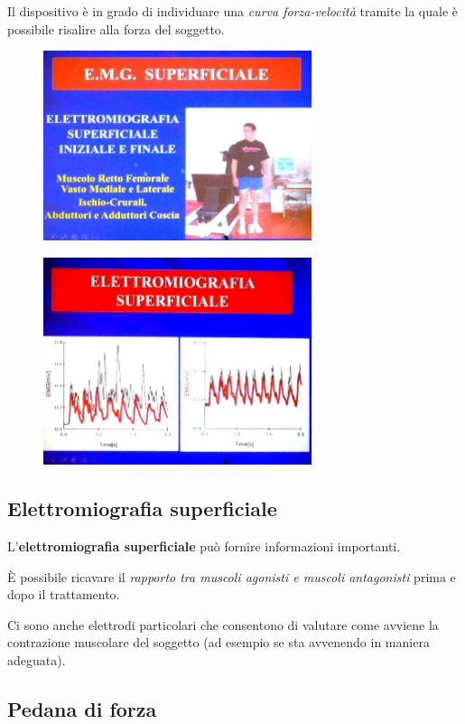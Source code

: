 Il dispositivo è in grado di individuare una \emph{curva forza-velocità}
tramite la quale è possibile risalire alla forza del soggetto.
\begin{figure}[!ht]
\centering
	\includegraphics[width=0.7\textwidth]{030/image10.jpeg}
\end{figure}

\begin{figure}[!ht]
\centering
	\includegraphics[width=0.7\textwidth]{030/image11.jpeg}
\end{figure}

\subsection{Elettromiografia superficiale }

L'\textbf{elettromiografia superficiale} può fornire informazioni
importanti.

È possibile ricavare il \emph{rapporto tra muscoli agonisti e muscoli
antagonisti} prima e dopo il trattamento.

Ci sono anche elettrodi particolari che consentono di valutare come
avviene la contrazione muscolare del soggetto (ad esempio se sta
avvenendo in maniera adeguata).
\subsection{Pedana di forza}

